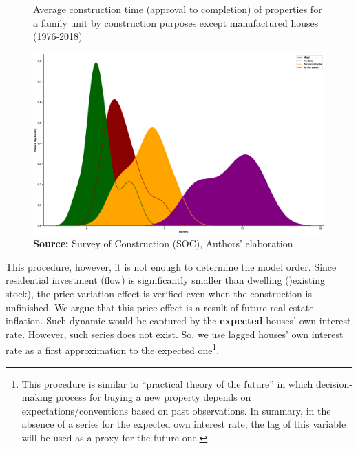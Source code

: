 \begin{figure}[H]
	\centering
	\caption{Average construction time (approval to completion) of properties for a family unit by construction purposes except manufactured houses (1976-2018)}
	\label{meses}
	\includegraphics[height=.4\textheight]{./figs/Meses_contrucao.eps}
	\caption*{\textbf{Source:} Survey of Construction (SOC), Authors' elaboration}
\end{figure}

This procedure, however, it is not enough to determine the model order. 
Since residential investment (flow) is significantly smaller than dwelling ()existing stock), the price variation effect  is verified even
when the construction is unfinished. 
We argue that this price effect is a result of future real estate inflation.
Such dynamic would be captured by the \textbf{expected} houses' own interest rate.
However, such series does not exist. So, we use lagged houses' own interest rate as a first approximation to the expected one\footnote{
	This procedure is similar to \textcite{keynes_general_1937} ``practical theory of the future'' in which decision-making process for buying a new property depends on expectations/conventions based on past observations. 
	In summary, in the absence of a series for the expected own interest rate, the lag of this variable will be used as a proxy for the future one.
}.


